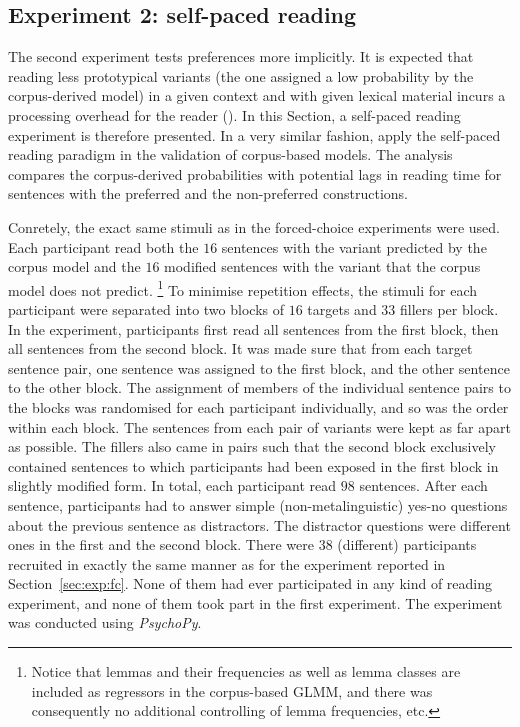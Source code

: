 \documentclass[USenglish]{article}
\begin{document}

\subsection{Experiment 2: self-paced reading}
\label{sec:exp:spr}

The second experiment tests preferences more implicitly.
It is expected that reading less prototypical variants (the one assigned a low probability by the corpus-derived model) in a given context and with given lexical material incurs a processing overhead for the reader (\citealp{Kaiser2013}).
In this Section, a self-paced reading experiment is therefore presented.
In a very similar fashion, \cite{DivjakEa2016} apply the self-paced reading paradigm in the validation of corpus-based models.
The analysis compares the corpus-derived probabilities with potential lags in reading time for sentences with the preferred and the non-preferred constructions.

Conretely, the exact same stimuli as in the forced-choice experiments were used.
Each participant read both the $16$ sentences with the variant predicted by the corpus model and the $16$ modified sentences with the variant that the corpus model does not predict.%
\footnote{Notice that lemmas and their frequencies as well as lemma classes are included as regressors in the corpus-based GLMM, and there was consequently no additional controlling of lemma frequencies, etc.}
To minimise repetition effects, the stimuli for each participant were separated into two blocks of $16$ targets and $33$ fillers per block.
In the experiment, participants first read all sentences from the first block, then all sentences from the second block.
It was made sure that from each target sentence pair, one sentence was assigned to the first block, and the other sentence to the other block.
The assignment of members of the individual sentence pairs to the blocks was randomised for each participant individually, and so was the order within each block.
The sentences from each pair of variants were kept as far apart as possible.
The fillers also came in pairs such that the second block exclusively contained sentences to which participants had been exposed in the first block in slightly modified form.
In total, each participant read $98$ sentences.
After each sentence, participants had to answer simple (non-metalinguistic) yes-no questions about the previous sentence as distractors.
The distractor questions were different ones in the first and the second block.
There were $38$ (different) participants recruited in exactly the same manner as for the experiment reported in Section~\ref{sec:exp:fc}.
None of them had ever participated in any kind of reading experiment, and none of them took part in the first experiment.
The experiment was conducted using \textit{PsychoPy}.
\end{document}
